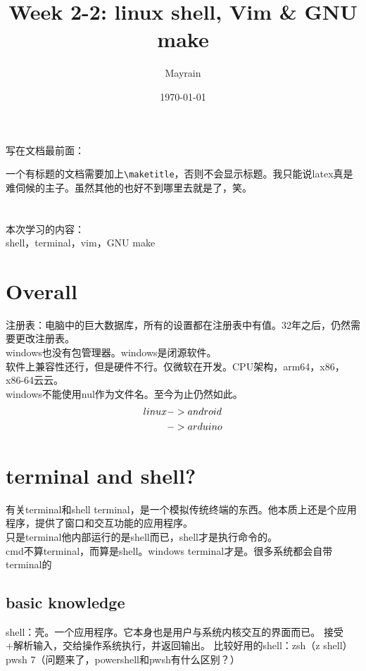 \documentclass{article}
\title{Week 2-2: linux shell, Vim \& GNU make}
\author{Mayrain}
\date{\today}
\begin{document}
\maketitle

\begin{center}
    写在文档最前面：
\end{center}
一个有标题的文档需要加上\verb|\maketitle|，否则不会显示标题。我只能说latex真是难伺候的主子。虽然其他的也好不到哪里去就是了，笑。\\
\\
\\
\noindent
本次学习的内容：\\
shell，terminal，vim，GNU make\\

\section{Overall}
\noindent
注册表：电脑中的巨大数据库，所有的设置都在注册表中有值。32年之后，仍然需要更改注册表。\\
windows也没有包管理器。windows是闭源软件。\\
软件上兼容性还行，但是硬件不行。仅微软在开发。CPU架构，arm64，x86，x86-64云云。\\
windows不能使用nul作为文件名。至今为止仍然如此。\\
\begin{align}
    linux & ->android \notag   \\
          & ->arduino   \notag
\end{align}

\section{terminal and shell?}
\noindent
有关terminal和shell
terminal，是一个模拟传统终端的东西。他本质上还是个应用程序，提供了窗口和交互功能的应用程序。\\
只是terminal他内部运行的是shell而已，shell才是执行命令的。\\
cmd不算terminal，而算是shell。windows terminal才是。很多系统都会自带terminal的

\subsection{basic knowledge}
\noindent
shell：壳。一个应用程序。它本身也是用户与系统内核交互的界面而已。
接受+解析输入，交给操作系统执行，并返回输出。
比较好用的shell：zsh（z shell）
pwsh 7（问题来了，powershell和pwsh有什么区别？）
\end{document}
